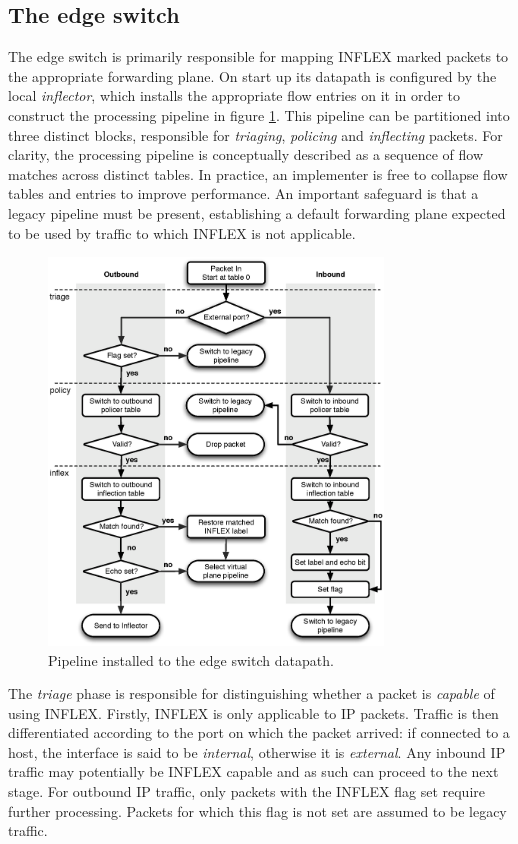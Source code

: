 \subsection{The edge switch}

The edge switch is primarily responsible for mapping INFLEX marked packets to the appropriate forwarding plane.
On start up its datapath is configured by the local \emph{inflector}, which installs the appropriate flow entries on it in order to construct the processing pipeline in figure \ref{fig:pipeline}.
This pipeline can be partitioned into three distinct blocks, responsible for \emph{triaging}, \emph{policing} and \emph{inflecting} packets.
For clarity, the processing pipeline is conceptually described as a sequence of flow matches across distinct tables.
In practice, an implementer is free to collapse flow tables and entries to improve performance.
An important safeguard is that a legacy pipeline must be present, establishing a default forwarding plane expected to be used by traffic to which INFLEX is not applicable.

\begin{figure}
    \centering
    \includegraphics[width=3.5in]{figures/inflex/flowchart}
    \caption{Pipeline installed to the edge switch datapath.}
    \label{fig:pipeline}
\end{figure}

The \emph{triage} phase is responsible for distinguishing whether a packet is \emph{capable} of using INFLEX.
Firstly, INFLEX is only applicable to \ac{IP} packets.
Traffic is then differentiated according to the port on which the packet arrived: if connected to a host, the interface is said to be \emph{internal}, otherwise it is \emph{external}.
Any inbound \ac{IP} traffic may potentially be INFLEX capable and as such can proceed to the next stage.
For outbound \ac{IP} traffic, only packets with the INFLEX flag set require further processing.
Packets for which this flag is not set are assumed to be legacy traffic.

